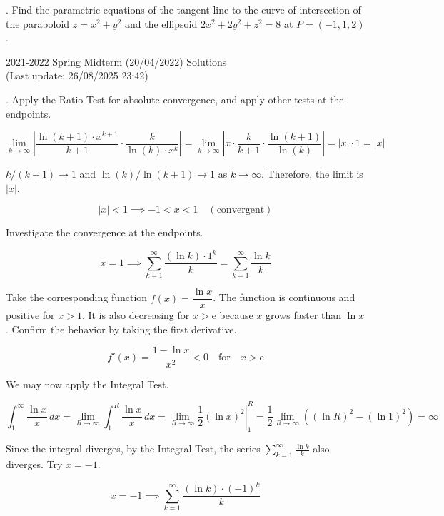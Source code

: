 \documentclass{article}
\begin{document}
\hfill

. Find the parametric equations of the tangent line to the curve of intersection of the paraboloid $z=x^2+y^2$ and the ellipsoid $2x^2+2y^2+z^2=8$ at $P=(-1,1,2)$.

\newpage

\begin{center}
2021-2022 Spring Midterm (20/04/2022) Solutions\\
(Last update: 26/08/2025 23:42)
\end{center}

. Apply the Ratio Test for absolute convergence, and apply other tests at the endpoints.

\[\lim_{k\to\infty}\left|\frac{\ln(k+1)\cdot x^{k+1}}{k+1}\cdot\frac k{\ln(k)\cdot x^k}\right|=\lim_{k\to\infty}\left|x\cdot\frac{k}{k+1}\cdot\frac{\ln(k+1)}{\ln(k)}\right|=|x|\cdot1=|x|\]

\hfill

\noindent $k/(k+1)\to1$ and $\ln(k)/\ln(k+1)\to1$ as $k\to\infty$. Therefore, the limit is $|x|$.

\[|x|<1\implies-1<x<1\quad(\text{convergent})\]


\hfill

\noindent Investigate the convergence at the endpoints.

\[x=1\implies \sum_{k=1}^{\infty}\frac{(\ln k)\cdot 1^k}{k}=\sum_{k=1}^{\infty}\frac{\ln k}{k}\]

\hfill

\noindent Take the corresponding function $f(x)=\dfrac{\ln x}x$. The function is continuous and positive for $x>1$. It is also decreasing for $x>\mathrm{e}$ because $x$ grows faster than $\ln x$. Confirm the behavior by taking the first derivative.

\[f'(x)=\frac{1-\ln x}{x^2}<0\quad\text{for}\quad x>\mathrm e\]

\hfill

\noindent We may now apply the Integral Test.

\[\int_1^{\infty}\frac{\ln x}x\,dx=\lim_{R\to\infty}\int_1^R\frac{\ln x}x\,dx=\lim_{R\to\infty}\left.\frac12\left(\ln x\right)^2\right|_1^R=\frac12\lim_{R\to\infty}\left((\ln R)^2-(\ln1)^2\right)=\infty\]

\hfill

\noindent Since the integral diverges, by the Integral Test, the series $\displaystyle\sum_{k=1}^{\infty}\frac{\ln k}k$ also diverges. Try $x=-1$.

\[x=-1\implies \sum_{k=1}^{\infty}\frac{(\ln k)\cdot(-1)^k}{k}\]
\end{document}
